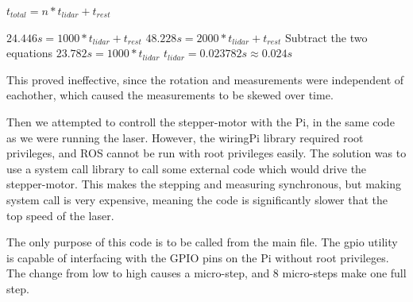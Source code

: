$t_{total} = n*t_{lidar} + t_{rest}$

$24.446s = 1000*t_{lidar} + t_{rest}$
$48.228s = 2000*t_{lidar} + t_{rest}$
Subtract the two equations
$23.782s = 1000*t_{lidar}$
$t_{lidar} = 0.023782s \approx 0.024s$


This proved ineffective, since the rotation and measurements were independent of eachother, which caused the measurements to be skewed over time.

Then we attempted to controll the stepper-motor with the Pi, in the same code as we were running the laser. However, the wiringPi library required root privileges, and ROS cannot be run with root privileges easily. The solution was to use a system call library to call some external code which would drive the stepper-motor. This makes the stepping and measuring synchronous, but making system call is very expensive, meaning the code is significantly slower that the top speed of the laser.




The only purpose of this code is to be called from the main file. The gpio utility is capable of interfacing with the GPIO pins on the Pi without root privileges. The change from low to high causes a micro-step, and 8 micro-steps make one full step.
